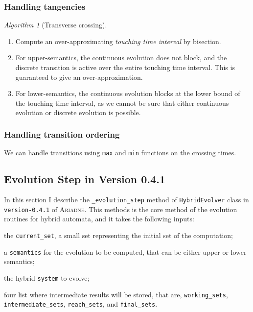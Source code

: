 \documentclass[english,a4paper]{article}
\newcommand{\ARIADNE}{\textsc{Ariadne}\xspace}
\theoremstyle{theorem}
\theoremstyle{definition}
\theoremstyle{remark}
\newtheorem*{algorithm*}{Algorithm}
\begin{document}
\subsubsection*{Handling tangencies}

\begin{algorithm*}[Transverse crossing]\mbox{}
\begin{enumerate}
\item Compute an over-approximating \emph{touching time interval} by bisection.
\item For upper-semantics, the continuous evolution does not block, and the discrete transition is active over the entire touching time interval. This is guaranteed to give an over-approximation.
\item For lower-semantics, the continuous evolution blocks at the lower bound of the touching time interval, as we cannot be sure that either continuous evolution or discrete evolution is possible.
\end{enumerate}
\end{algorithm*}

\subsubsection*{Handling transition ordering}

We can handle transitions using \texttt{max} and \texttt{min} functions on the crossing times.

\subsection*{Evolution Step in Version 0.4.1}

\noindent In this section I describe the \texttt{\_evolution\_step} method of \texttt{HybridEvolver} class in \texttt{version-0.4.1} of \ARIADNE. This methods is the core method of the evolution routines for hybrid automata, and it takes the following inputs:

\begin{compactitem}
	\item the \texttt{current\_set}, a small set representing the initial set of the computation;
	\item a \texttt{semantics} for the evolution to be computed, that can be either upper or lower semantics;
	\item the hybrid \texttt{system} to evolve;
	\item four list where intermediate results will be stored, that are, \texttt{working\_sets}, \texttt{intermediate\_sets}, \texttt{reach\_sets}, and \texttt{final\_sets}.
\end{compactitem}
\end{document}
